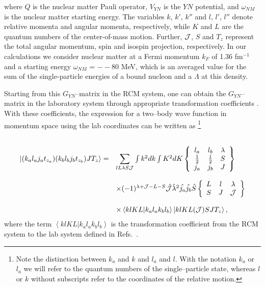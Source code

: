 where $Q$ is the nuclear matter Pauli operator,
$V_{YN}$ is the $YN$ potential, and
$\omega_{NM}$ is the nuclear matter starting
energy.
The variables $k$, $k'$, $k''$ and $l$, $l'$,
$l''$ denote relative momenta and angular momenta, respectively,
while
$K$ and $L$ are the quantum numbers of the center-of-mass
motion. Further, ${\cal J}$, $S$ and $T_z$ represent the total angular
momentum, spin and isospin projection,
respectively. In our calculations we consider nuclear matter at a Fermi
momentum $k_{F}$ of 1.36 fm$^{-1}$ and a starting energy $\omega_{NM}$ =
$--80$ MeV, which is an averaged value for the sum of the
single-particle energies of a bound nucleon and a $\Lambda$ at this
density. 

Starting from this $G_{YN}$--matrix in the RCM
system, one can obtain the $G_{YN}$--matrix in the laboratory system
through appropriate transformation coefficients  \cite{bbmp92,hbmp93}.
With these coefficients,
the expression for a two--body wave function in momentum space
using the lab coordinates can be written as
\footnote{Note the distinction between
$k_a$ and $k$ and $l_a$ and $l$. With the notation $k_a$
or $l_a$ we will refer to the quantum numbers of the single--particle
state, whereas $l$ or $k$ without subscripts refer to the coordinates
of the relative motion.}

\begin{equation}
   \begin{array}{ll}
     &\\
     \left | (k_al_aj_at_{z_a})(k_bl_bj_bt_{z_b})JT_z\right \rangle =&
      {\displaystyle \sum_{lL\lambda S{\cal J}}}\int k^{2}dk\int K^{2}dK
      \left\{\begin{array}{ccc}
      l_a&l_b&\lambda\\\frac{1}{2}&\frac{1}{2}&S\\
      j_a&j_b&J\end{array}
      \right\}\\&\\
      &\times (-1)^{\lambda +{\cal J}-L-S}
      \hat{{\cal J}}\hat{\lambda}^{2}
      \hat{j_{a}}\hat{j_{b}}\hat{S}
      \left\{\begin{array}{ccc}L&l&\lambda\\S&J&{\cal J}
      \end{array}\right\}\\&\\
      &\times \left\langle klKL| k_al_ak_bl_b\right\rangle
      \left | klKL({\cal J})SJT_z\right \rangle ,
   \end{array}
\end{equation}
where the term $\left\langle klKL| k_al_ak_bl_b\right\rangle$
is the transformation coefficient from the RCM system to the lab system
 defined in Refs.\  \cite{kkr79,wc72}.

